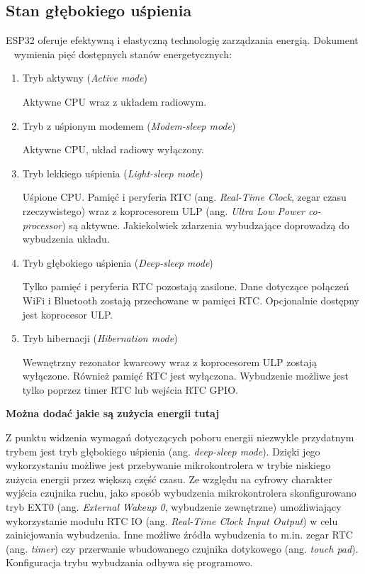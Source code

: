         \subsection{Stan głębokiego uśpienia}

            ESP32 oferuje efektywną i elastyczną technologię zarządzania energią. Dokument ~\cite{esp32-ds} wymienia pięć dostępnych stanów energetycznych:

            \begin{enumerate}
                \item Tryb aktywny (\textit{Active mode})

                    Aktywne CPU wraz z układem radiowym.

                \item Tryb z uśpionym modemem (\textit{Modem-sleep mode})

                    Aktywne CPU, układ radiowy wyłączony.
                
                \item Tryb lekkiego uśpienia (\textit{Light-sleep mode})

                    Uśpione CPU. Pamięć i peryferia RTC (ang. \textit{Real-Time Clock}, zegar czasu rzeczywistego) wraz z koprocesorem ULP (ang. \textit{Ultra Low Power co-processor}) są aktywne. Jakiekolwiek zdarzenia wybudzające doprowadzą do wybudzenia układu.

                \item Tryb głębokiego uśpienia (\textit{Deep-sleep mode})

                    Tylko pamięć i peryferia RTC pozostają zasilone. Dane dotyczące połączeń WiFi i Bluetooth zostają przechowane w pamięci RTC. Opcjonalnie dostępny jest koprocesor ULP.

                \item Tryb hibernacji (\textit{Hibernation mode})

                    Wewnętrzny rezonator kwarcowy wraz z koprocesorem ULP zostają wyłączone. Również pamięć RTC jest wyłączona. Wybudzenie możliwe jest tylko poprzez timer RTC lub wejścia RTC GPIO.

            \end{enumerate}

            \textbf{Można dodać jakie są zużycia energii tutaj}

            Z punktu widzenia wymagań dotyczących poboru energii niezwykle przydatnym trybem jest tryb głębokiego uśpienia (ang. \textit{deep-sleep mode}). Dzięki jego wykorzystaniu możliwe jest przebywanie mikrokontrolera w trybie niskiego zużycia energii przez większą część czasu. Ze względu na cyfrowy charakter wyjścia czujnika ruchu, jako sposób wybudzenia mikrokontrolera skonfigurowano tryb EXT0 (ang. \textit{External Wakeup 0}, wybudzenie zewnętrzne) umożliwiający wykorzystanie modułu RTC IO (ang. \textit{Real-Time Clock Input Output}) w celu zainicjowania wybudzenia. Inne możliwe źródła wybudzenia to m.in. zegar RTC (ang. \textit{timer}) czy przerwanie wbudowanego czujnika dotykowego (ang. \textit{touch pad}). Konfiguracja trybu wybudzania odbywa się programowo.

